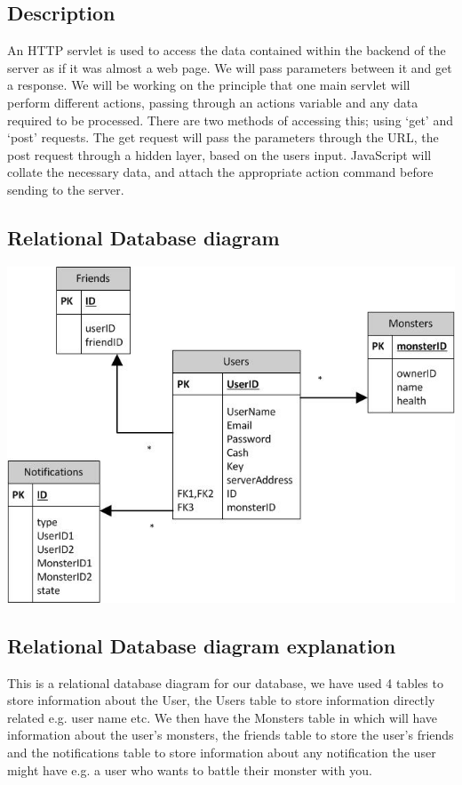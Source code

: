 \documentclass{project}
\begin{document}
\subsection{Description}
An HTTP servlet is used to access the data contained within the backend of the server as if it was almost a web page.  We will pass parameters between it and get a response. We will be working on the principle that one main servlet will perform different actions, passing through an actions variable and any data required to be processed. There are two methods of accessing this; using ‘get’ and ‘post’ requests.  The get request will pass the parameters through the URL, the post request through a hidden layer, based on the users input. JavaScript will collate the necessary data, and attach the appropriate action command before sending to the server.
\subsection{Relational Database diagram}
\includegraphics{relationshipDiagram.jpg}
\subsection{Relational Database diagram explanation}
This is a relational database diagram for our database, we have used 4 tables to store information about the User, the Users table to store information directly related e.g. user name etc.  We then have the Monsters table in which will have information about the user’s monsters, the friends table to store the user’s friends and the notifications table to store information about any notification the user might have e.g. a user who wants to battle their monster with you.
\end{document}
